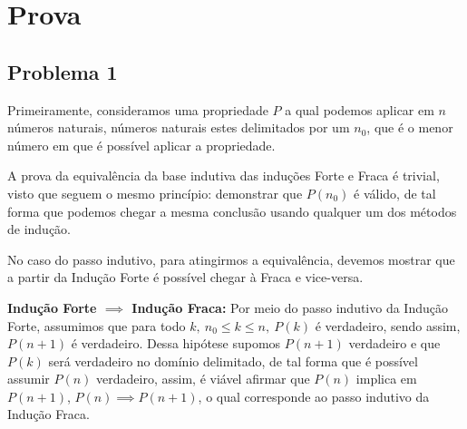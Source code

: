\documentclass[a4paper, 10pt]{article}
\begin{document}


\section{Prova}

\subsection{Problema 1}

Primeiramente, consideramos uma propriedade $P$ a qual podemos aplicar em $n$ números naturais, números naturais estes delimitados por um $n_0$, que é o menor número em que é possível aplicar a propriedade.

A prova da equivalência da base indutiva das induções Forte e Fraca é trivial, visto que seguem o mesmo princípio: demonstrar que $P(n_0)$ é válido, de tal forma que podemos chegar a mesma conclusão usando qualquer um dos métodos de indução.

No caso do passo indutivo, para atingirmos a equivalência, devemos mostrar que a partir da Indução Forte é possível chegar à Fraca e vice-versa.

\textbf{Indução Forte $\implies$ Indução Fraca:}
	Por meio do passo indutivo da Indução Forte, assumimos que para todo $k,\:n_0 \leq k \leq n,\:P(k)$ é verdadeiro, sendo assim, $P(n+1)$ é verdadeiro.
	Dessa hipótese supomos $P(n+1)$ verdadeiro e que $P(k)$ será verdadeiro no domínio delimitado, de tal forma que é possível assumir $P(n)$ verdadeiro, assim, é viável afirmar que $P(n)$ implica em $P(n+1)$, $P(n) \implies P(n+1)$, o qual corresponde ao passo indutivo da Indução Fraca.
	
\end{document}
